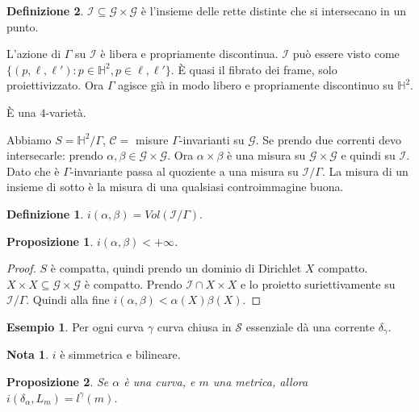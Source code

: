 \documentclass[a4paper]{article}
\newtheorem{proposition}{Proposizione}
\theoremstyle{definition}
\newtheorem{definition}{Definizione}
\newtheorem{example}{Esempio}
\newtheorem{remark}{Nota}
\begin{document}
\begin{definition}
    $\mathcal I \subseteq \mathcal G \times \mathcal G$ è l'insieme delle rette distinte che si intersecano in un punto.

    L'azione di $\Gamma$ su $\mathcal I$ è libera e propriamente discontinua. $\mathcal I$ può essere visto come $\{(p,\ell,\ell'): p \in \mathbb H^2, p \in \ell,\ell'\}$. È quasi il fibrato dei frame, solo proiettivizzato. Ora $\Gamma$ agisce già in modo libero e propriamente discontinuo su $\mathbb H^2$.

    È una $4$-varietà.

    Abbiamo $S = \mathbb H^2 / \Gamma$, $\mathcal C =$ misure $\Gamma$-invarianti su $\mathcal G$. Se prendo due correnti devo intersecarle: prendo $\alpha, \beta \in \mathcal G \times \mathcal G$. Ora $\alpha \times \beta$ è una misura su $\mathcal G \times \mathcal G$ e quindi su $\mathcal I$. Dato che è $\Gamma$-invariante passa al quoziente a una misura su $\mathcal I / \Gamma$. La misura di un insieme di sotto è la misura di una qualsiasi controimmagine buona.
    \begin{definition}
        $i(\alpha,\beta) = Vol(\mathcal I / \Gamma)$.
    \end{definition}

    \begin{proposition}
        $i(\alpha,\beta) < + \infty$.
    \end{proposition}
    \begin{proof}
        $S$ è compatta, quindi prendo un dominio di Dirichlet $X$ compatto. $X \times X \subseteq \mathcal G \times \mathcal G$ è compatto. Prendo $\mathcal I \cap X \times X$ e lo proietto suriettivamente su $\mathcal I / \Gamma$. Quindi alla fine $i(\alpha,\beta)<\alpha(X) \beta(X)$.
    \end{proof}

    \begin{example}
        Per ogni curva $\gamma$ curva chiusa in $\mathcal S$ essenziale dà una corrente $\delta_\gamma$.
    \end{example}

    \begin{remark}
        $i$ è simmetrica e bilineare.
    \end{remark}

    \begin{proposition}
        Se $\alpha$ è una curva, e $m$ una metrica, allora $i(\delta_\alpha, L_{m}) = l^{\gamma}(m)$.
    \end{proposition}


\end{definition}
\end{document}
